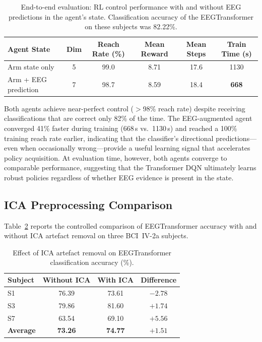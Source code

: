 \documentclass[12pt, a4paper]{article}
\begin{document}
\begin{table}[htbp]
\centering
\caption{End-to-end evaluation: RL control performance with and without EEG predictions in the agent's state. Classification accuracy of the EEGTransformer on these subjects was 82.22\%.}
\label{tab:e2e_eval}
\begin{tabular}{lccccc}
\toprule
\textbf{Agent State} & \textbf{Dim} & \textbf{Reach Rate (\%)} & \textbf{Mean Reward} & \textbf{Mean Steps} & \textbf{Train Time (s)} \\
\midrule
Arm state only     & 5 & 99.0 & 8.71 & 17.6 & 1130 \\
Arm + EEG prediction & 7 & 98.7 & 8.59 & 18.4 & \textbf{668} \\
\bottomrule
\end{tabular}
\end{table}

Both agents achieve near-perfect control ($>$98\% reach rate) despite receiving classifications that are correct only 82\% of the time. The EEG-augmented agent converged 41\% faster during training (668\,s vs.\ 1130\,s) and reached a 100\% training reach rate earlier, indicating that the classifier's directional predictions---even when occasionally wrong---provide a useful learning signal that accelerates policy acquisition. At evaluation time, however, both agents converge to comparable performance, suggesting that the Transformer DQN ultimately learns robust policies regardless of whether EEG evidence is present in the state.

\subsection{ICA Preprocessing Comparison}
\label{sec:ica_results}

Table~\ref{tab:ica_comparison} reports the controlled comparison of EEGTransformer accuracy with and without ICA artefact removal on three BCI~IV-2a subjects.

\begin{table}[htbp]
\centering
\caption{Effect of ICA artefact removal on EEGTransformer classification accuracy (\%).}
\label{tab:ica_comparison}
\begin{tabular}{lccc}
\toprule
\textbf{Subject} & \textbf{Without ICA} & \textbf{With ICA} & \textbf{Difference} \\
\midrule
S1 & 76.39 & 73.61 & $-2.78$ \\
S3 & 79.86 & 81.60 & $+1.74$ \\
S7 & 63.54 & 69.10 & $+5.56$ \\
\midrule
\textbf{Average} & \textbf{73.26} & \textbf{74.77} & $\mathbf{+1.51}$ \\
\bottomrule
\end{tabular}
\end{table}
\end{document}
